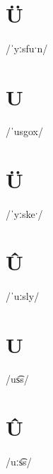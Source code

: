 \documentclass[10pt,a4paper,twoside]{book}
\begin{document}
\section*{Ü}

\begin{multicols}{3}
 {/ˈyːsfuˑn/} {}
\end{multicols}

\section*{U}

\begin{multicols}{3}
 {/ˈusgox/} {}
\end{multicols}

\section*{Ü}

\begin{multicols}{3}
 {/ˈyːskeˑ/} {}
\end{multicols}

\section*{Û}

\begin{multicols}{3}
 {/ˈuːsly/} {}
\end{multicols}

\section*{U}

\begin{multicols}{3}
 {/us͡s/} {}
\end{multicols}

\section*{Û}

\begin{multicols}{3}
 {/uːs͡s/} {}
\end{multicols}
\end{document}
